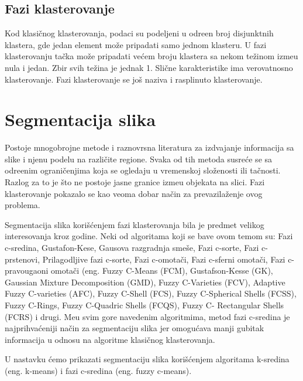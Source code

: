 \documentclass{article}
\begin{document}
\subsection{\selectfont Fazi klasterovanje}

Kod klasi\v{c}nog klasterovanja, podaci su podeljeni u odre\dj en broj disjunktnih klastera, gde jedan element mo\v{z}e pripadati samo jednom klasteru. U fazi klasterovanju ta\v{c}ka mo\v{z}e pripadati ve\'{c}em broju klastera sa nekom te\v{z}inom izme\dj u nula i jedan. Zbir svih te\v{z}ina je jednak 1. Sli\v{c}ne karakteristike ima verovatnosno klasterovanje. Fazi klasterovanje se jo\v{s} naziva i rasplinuto klasterovanje.


\section{\selectfont Segmentacija slika}

Postoje mnogobrojne metode i raznovrsna literatura za izdvajanje informacija sa slike i njenu podelu na razli\v{c}ite regione. Svaka od tih metoda susre\'{c}e se sa odre\dj enim ograni\v{c}enjima koja se ogledaju u vremenskoj slo\v{z}enosti ili ta\v{c}nosti. Razlog za to je \v{s}to ne postoje jasne granice izme\dj u objekata na slici. Fazi klasterovanje pokazalo se kao veoma dobar na\v{c}in za prevazila\v{z}enje ovog problema.

Segmentacija slika kori\v{s}\'{c}enjem fazi klasterovanja bila je predmet velikog interesovanja kroz godine. Neki od algoritama koji se bave ovom temom su: Fazi c-sredina, Gustafon-Kese, Gausova razgradnja sme\v{s}e, Fazi c-sorte, Fazi c-prstenovi,  Prilagodljive fazi c-sorte, Fazi c-omota\v{c}i, Fazi c-sferni omota\v{c}i,  Fazi c-pravougaoni omota\v{c}i (eng. {\selectfont Fuzzy C-Means (FCM), Gustafson-Kesse (GK), Gaussian Mixture Decomposition (GMD), Fuzzy C-Varieties (FCV), Adaptive Fuzzy C-varieties (AFC), Fuzzy C-Shell (FCS), Fuzzy C-Spherical Shells (FCSS), Fuzzy C-Rings, Fuzzy C-Quadric Shells (FCQS), Fuzzy C- Rectangular Shells (FCRS)} i drugi. Me\dj u svim gore navedenim algoritmima, metod fazi c-sredina je najprihva\'{c}eniji na\v{c}in za segmentaciju slika jer omogu\'{c}ava manji gubitak informacija u odnosu na algoritme klasi\v{c}nog klasterovanja.

U nastavku \'{c}emo prikazati segmentaciju slika kori\v{s}\'{c}enjem algoritama k-sredina (eng. {\selectfont k-means}) i fazi c-sredina (eng. {\selectfont fuzzy c-means}).
\end{document}
